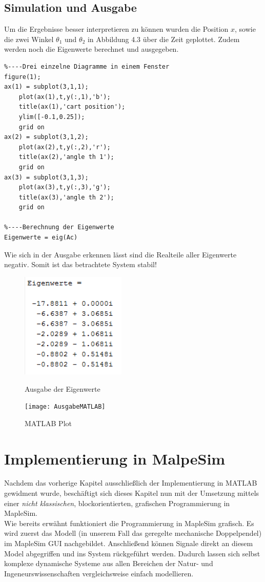 \documentclass[a4paper, 10pt]{report}
\begin{document}
\section{Simulation und Ausgabe}
Um die Ergebnisse besser interpretieren zu können wurden die Position $x$, sowie die zwei Winkel $\theta_{1}$ und $\theta_{2}$ in Abbildung 4.3 über die Zeit geplottet. Zudem werden noch die Eigenwerte berechnet und ausgegeben.  
\begin{lstlisting}
%----Drei einzelne Diagramme in einem Fenster
figure(1);
ax(1) = subplot(3,1,1);
    plot(ax(1),t,y(:,1),'b');
    title(ax(1),'cart position'); 
    ylim([-0.1,0.25]);            
    grid on                       
ax(2) = subplot(3,1,2);           
    plot(ax(2),t,y(:,2),'r');     
    title(ax(2),'angle th 1');
    grid on
ax(3) = subplot(3,1,3);
    plot(ax(3),t,y(:,3),'g');
    title(ax(3),'angle th 2');
    grid on

%----Berechnung der Eigenwerte
Eigenwerte = eig(Ac)
\end{lstlisting}
Wie sich in der Ausgabe erkennen lässt sind die Realteile aller Eigenwerte negativ. Somit ist das betrachtete System stabil!
\begin{figure}[h]
\centering  %
{\includegraphics[width=5cm]{Eigenwerte}}
\caption{Ausgabe der Eigenwerte}
\end{figure}

\begin{figure}[h]
\centering  %
{\texttt{[image: AusgabeMATLAB]}}
\caption{MATLAB Plot}
\end{figure}

\chapter{Implementierung in MalpeSim}
Nachdem das vorherige Kapitel ausschließlich der Implementierung in MATLAB gewidment wurde, beschäftigt sich dieses Kapitel nun mit der Umsetzung mittels einer \textit{nicht klassischen}, blockorientierten, grafischen Programmierung in MapleSim. \\
Wie bereits erwähnt funktioniert die Programmierung in MapleSim grafisch. Es wird zuerst das Modell (in unserem Fall das geregelte mechanische Doppelpendel) im MapleSim GUI nachgebildet. Anschließend können Signale direkt an diesem Model abgegriffen und ins System rückgeführt werden. Dadurch lassen sich selbst komplexe dynamische Systeme aus allen Bereichen der Natur- und Ingeneurswissenschaften vergleichsweise einfach modellieren.
\end{document}
